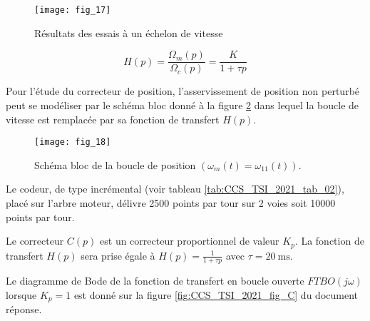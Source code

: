 \begin{figure}
\centering
\texttt{[image: fig\_17]}
\caption{\label{fig:CCS_TSI_2021_fig_17}Résultats des essais à un échelon de vitesse}
\end{figure}



$$
H(p)=\frac{\Omega_{m}(p)}{\Omega_{c}(p)}=\frac{K}{1+\tau p}
$$

Pour l'étude du correcteur de position, l'asservissement de position non perturbé peut se modéliser par le schéma bloc donné à la figure \ref{fig:CCS_TSI_2021_fig_18} dans lequel la boucle de vitesse est remplacée par sa fonction de transfert $H(p)$.

\begin{figure}
\centering
\texttt{[image: fig\_18]}
\caption{\label{fig:CCS_TSI_2021_fig_18}Schéma bloc de la boucle de position $\left(\omega_{m}(t)=\omega_{11}(t)\right)$.}
\end{figure}


Le codeur, de type incrémental (voir tableau \ref{tab:CCS_TSI_2021_tab_02}), placé sur l'arbre moteur, délivre 2500 points par tour sur 2 voies soit 10000 points par tour.



Le correcteur $C(p)$ est un correcteur proportionnel de valeur $K_{p}$. La fonction de transfert $H(p)$ sera prise égale à $H(p)=\frac{1}{1+\tau p}$ avec $\tau=20 \mathrm{~ms}$.


Le diagramme de Bode de la fonction de transfert en boucle ouverte $F T B O(j \omega)$ lorsque $K_{p}=1$ est donné sur la figure \ref{fig:CCS_TSI_2021_fig_C} du document réponse.

